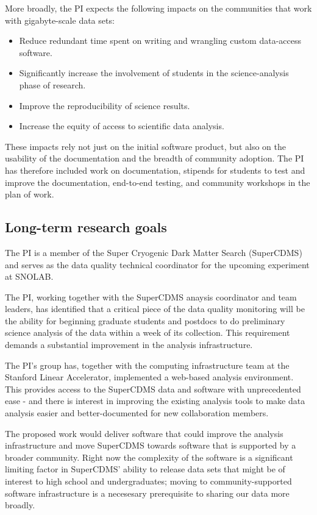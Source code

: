 More broadly, the PI expects the following impacts on the communities that work with gigabyte-scale data sets:

\begin{itemize}
    \item Reduce redundant time spent on writing and wrangling custom data-access software.
    \item Significantly increase the involvement of students in the science-analysis phase of research.
    \item Improve the reproducibility of science results. 
    \item Increase the equity of access to scientific data analysis.
\end{itemize}

These impacts rely not just on the initial software product, but also on the usability of the documentation and the breadth of community adoption.  The PI has therefore included work on documentation, stipends for students to test and improve the documentation, end-to-end testing, and community workshops in the plan of work.

\subsection{Long-term research goals}
The PI is a member of the Super Cryogenic Dark Matter Search (SuperCDMS) and serves as the data quality technical coordinator for the upcoming experiment at SNOLAB.

The PI, working together with the SuperCDMS anaysis coordinator and team leaders, has identified that a critical piece of the data quality monitoring will be the ability for beginning graduate students and postdocs to do preliminary science analysis of the data within a week of its collection.  This requirement demands a substantial improvement in the analysis infrastructure.

The PI's group has, together with the computing infrastructure team at the Stanford Linear Accelerator, implemented a web-based analysis environment.  This provides access to the SuperCDMS data and software with unprecedented ease - and there is interest in improving the existing analysis tools to make data analysis easier and better-documented for new collaboration members. 

The proposed work would deliver software that could improve the analysis infrastructure and move SuperCDMS towards software that is supported by a broader community.  Right now the complexity of the software is a significant limiting factor in SuperCDMS' ability to release data sets that might be of interest to high school and undergraduates; moving to community-supported software infrastructure is a necesesary prerequisite to sharing our data more broadly.

